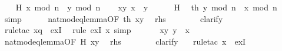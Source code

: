 \begin{isabellebody}
%
\isadelimproof
%
\endisadelimproof
%
\isatagproof
{}\isamarkupfalse%
\isanewline
\ \ \isamarkupfalse%
\ H{\isacharcolon}{\kern0pt}\ {\isachardoublequoteopen}x\ mod\ n\ {\isacharequal}{\kern0pt}\ y\ mod\ n{\isachardoublequoteclose}\isanewline
\ \ \isacommand{{\isacharbraceleft}{\kern0pt}}\isamarkupfalse%
\isamarkupfalse%
\ xy{\isacharcolon}{\kern0pt}\ {\isachardoublequoteopen}x\ {\isasymle}\ y{\isachardoublequoteclose}\isanewline
\ \ \ \ \isamarkupfalse%
\ H\ \isamarkupfalse%
\ th{\isacharcolon}{\kern0pt}\ {\isachardoublequoteopen}y\ mod\ n\ {\isacharequal}{\kern0pt}\ x\ mod\ n{\isachardoublequoteclose}\ \isamarkupfalse%
\ simp\isanewline
\ \ \ \ \isamarkupfalse%
\ nat{\isacharunderscore}{\kern0pt}mod{\isacharunderscore}{\kern0pt}eq{\isacharunderscore}{\kern0pt}lemma{\isacharbrackleft}{\kern0pt}OF\ th\ xy{\isacharbrackright}{\kern0pt}\ \isamarkupfalse%
\ {\isacharquery}{\kern0pt}rhs\isanewline
\ \ \ \ \ \ \isamarkupfalse%
\ clarify\ \ \isamarkupfalse%
\ {\isacharparenleft}{\kern0pt}rule{\isacharunderscore}{\kern0pt}tac\ x{\isacharequal}{\kern0pt}{\isachardoublequoteopen}q{\isachardoublequoteclose}\ \ exI{\isacharparenright}{\kern0pt}\ \isamarkupfalse%
\ {\isacharparenleft}{\kern0pt}rule\ exI{\isacharbrackleft}{\kern0pt}\ x{\isacharequal}{\kern0pt}{\isachardoublequoteopen}{}{\isachardoublequoteclose}{\isacharbrackright}{\kern0pt}{\isacharcomma}{\kern0pt}\ simp{\isacharparenright}{\kern0pt}\isacommand{{\isacharbraceright}{\kern0pt}}\isamarkupfalse%
\isanewline
\ \ \isamarkupfalse%
\isanewline
\ \ \isacommand{{\isacharbraceleft}{\kern0pt}}\isamarkupfalse%
\isamarkupfalse%
\ xy{\isacharcolon}{\kern0pt}\ {\isachardoublequoteopen}y\ {\isasymle}\ x{\isachardoublequoteclose}\isanewline
\ \ \ \ \isamarkupfalse%
\ nat{\isacharunderscore}{\kern0pt}mod{\isacharunderscore}{\kern0pt}eq{\isacharunderscore}{\kern0pt}lemma{\isacharbrackleft}{\kern0pt}OF\ H\ xy{\isacharbrackright}{\kern0pt}\ \isamarkupfalse%
\ {\isacharquery}{\kern0pt}rhs\isanewline
\ \ \ \ \ \ \isamarkupfalse%
\ clarify\ \ \isamarkupfalse%
\ {\isacharparenleft}{\kern0pt}rule{\isacharunderscore}{\kern0pt}tac\ x{\isacharequal}{\kern0pt}{\isachardoublequoteopen}{}{\isachardoublequoteclose}\ \ exI{\isacharparenright}{\kern0pt}\ \isamarkupfalse%

\end{isabellebody}
